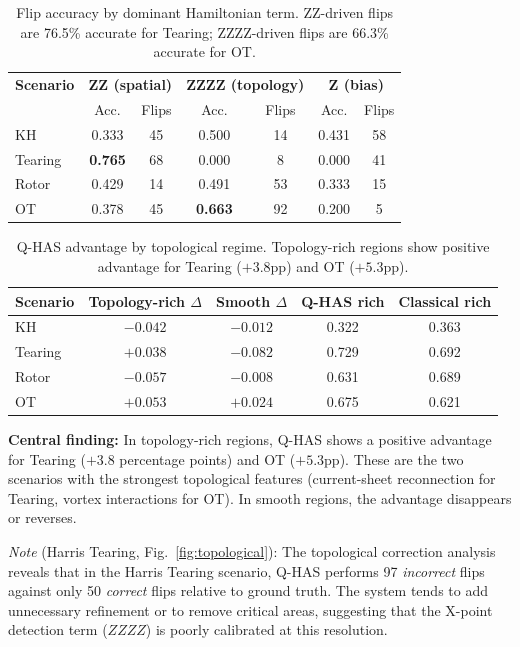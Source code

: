 \documentclass[12pt, a4paper, oneside]{report}
\begin{document}
\begin{table}[H]
\centering
\caption{Flip accuracy by dominant Hamiltonian term. ZZ-driven flips are 76.5\% accurate for Tearing; ZZZZ-driven flips are 66.3\% accurate for OT.}
\label{tab:flip-by-term}
\begin{tabular}{lcccccc}
\toprule
\textbf{Scenario} & \multicolumn{2}{c}{\textbf{ZZ (spatial)}} & \multicolumn{2}{c}{\textbf{ZZZZ (topology)}} & \multicolumn{2}{c}{\textbf{Z (bias)}} \\
 & Acc. & Flips & Acc. & Flips & Acc. & Flips \\
\midrule
KH      & 0.333 & 45 & 0.500 & 14 & 0.431 & 58 \\
Tearing & \textbf{0.765} & 68 & 0.000 & 8  & 0.000 & 41 \\
Rotor   & 0.429 & 14 & 0.491 & 53 & 0.333 & 15 \\
OT      & 0.378 & 45 & \textbf{0.663} & 92 & 0.200 & 5  \\
\bottomrule
\end{tabular}
\end{table}

\begin{table}[H]
\centering
\caption{Q-HAS advantage by topological regime. Topology-rich regions show positive advantage for Tearing ($+3.8$pp) and OT ($+5.3$pp).}
\label{tab:topo-regime}
\begin{tabular}{lcccc}
\toprule
\textbf{Scenario} & \textbf{Topology-rich $\Delta$} & \textbf{Smooth $\Delta$} & \textbf{Q-HAS rich} & \textbf{Classical rich} \\
\midrule
KH      & $-0.042$ & $-0.012$ & 0.322 & 0.363 \\
Tearing & $\mathbf{+0.038}$ & $-0.082$ & 0.729 & 0.692 \\
Rotor   & $-0.057$ & $-0.008$ & 0.631 & 0.689 \\
OT      & $\mathbf{+0.053}$ & $+0.024$ & 0.675 & 0.621 \\
\bottomrule
\end{tabular}
\end{table}

\textbf{Central finding:} In topology-rich regions, Q-HAS shows a positive advantage for Tearing ($+3.8$ percentage points) and OT ($+5.3$pp). These are the two scenarios with the strongest topological features (current-sheet reconnection for Tearing, vortex interactions for OT). In smooth regions, the advantage disappears or reverses.

\textit{Note} (Harris Tearing, Fig.~\ref{fig:topological}): The topological correction analysis reveals that in the Harris Tearing scenario, Q-HAS performs 97 \textit{incorrect} flips against only 50 \textit{correct} flips relative to ground truth. The system tends to add unnecessary refinement or to remove critical areas, suggesting that the X-point detection term ($ZZZZ$) is poorly calibrated at this resolution.
\end{document}
